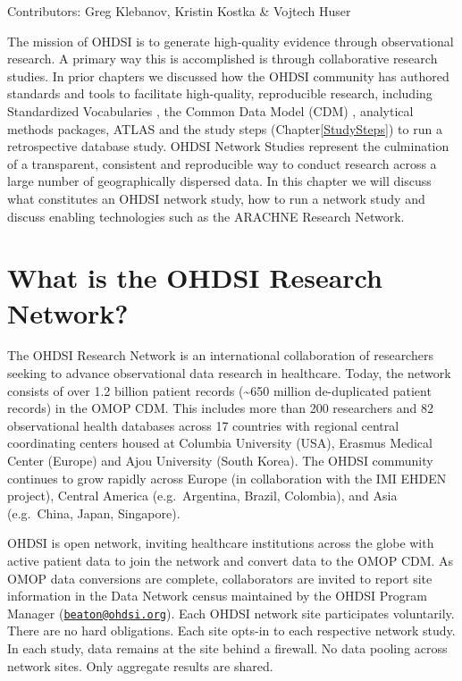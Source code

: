 \documentclass[11pt]{book}
\theoremstyle{definition}
\theoremstyle{definition}
\theoremstyle{definition}
\theoremstyle{remark}
\begin{document}
Contributors: Greg Klebanov, Kristin Kostka \& Vojtech Huser

The mission of OHDSI is to generate high-quality evidence through observational research. A primary way this is accomplished is through collaborative research studies. In prior chapters we discussed how the OHDSI community has authored standards and tools to facilitate high-quality, reproducible research, including Standardized Vocabularies , the Common Data Model (CDM) , analytical methods packages, ATLAS and the study steps (Chapter\ref{StudySteps}) to run a retrospective database study. OHDSI Network Studies represent the culmination of a transparent, consistent and reproducible way to conduct research across a large number of geographically dispersed data. In this chapter we will discuss what constitutes an OHDSI network study, how to run a network study and discuss enabling technologies such as the ARACHNE Research Network.

\hypertarget{what-is-the-ohdsi-research-network}{%
\section{What is the OHDSI Research Network?}\label{what-is-the-ohdsi-research-network}}

The OHDSI Research Network is an international collaboration of researchers seeking to advance observational data research in healthcare. Today, the network consists of over 1.2 billion patient records (\textasciitilde650 million de-duplicated patient records) in the OMOP CDM. This includes more than 200 researchers and 82 observational health databases across 17 countries with regional central coordinating centers housed at Columbia University (USA), Erasmus Medical Center (Europe) and Ajou University (South Korea). The OHDSI community continues to grow rapidly across Europe (in collaboration with the IMI EHDEN project), Central America (e.g.~Argentina, Brazil, Colombia), and Asia (e.g.~China, Japan, Singapore).

OHDSI is open network, inviting healthcare institutions across the globe with active patient data to join the network and convert data to the OMOP CDM. As OMOP data conversions are complete, collaborators are invited to report site information in the Data Network census maintained by the OHDSI Program Manager (\href{mailto:beaton@ohdsi.org}{\nolinkurl{beaton@ohdsi.org}}). Each OHDSI network site participates voluntarily. There are no hard obligations. Each site opts-in to each respective network study. In each study, data remains at the site behind a firewall. No data pooling across network sites. Only aggregate results are shared.
\end{document}
